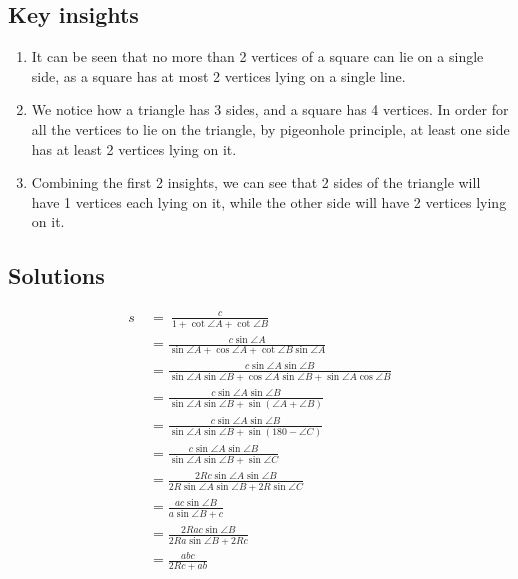 \documentclass[12pt]{scrartcl}
\begin{document}
\subsection{Key insights}
\begin{enumerate}
	\item It can be seen that no more than 2 vertices of a square can lie on a single side, as a square has at most 2 vertices lying on a single line.
	\item We notice how a triangle has 3 sides, and a square has 4 vertices. In order for all the vertices to lie on the triangle, by pigeonhole principle, at least one side has at least 2 vertices lying on it.
	\item Combining the first 2 insights, we can see that 2 sides of the triangle will have 1 vertices each lying on it, while the other side will have 2 vertices lying on it.
\end{enumerate}

\subsection{Solutions}
\begin{align*}
s\ &=\ \frac{c}{1+\cot \angle A+\cot \angle B} \\
&=\frac{c\sin \angle A}{\sin \angle A+\cos \angle A+\cot \angle B\sin \angle A} \\
&=\frac{c\sin \angle A\sin \angle B}{\sin \angle A\sin \angle B+\cos \angle A\sin \angle B+\sin \angle A\cos \angle B} \\
&=\frac{c\sin \angle A\sin \angle B}{\sin \angle A\sin \angle B+\sin\left(\angle A+\angle B\right)} \\
&=\frac{c\sin \angle A\sin \angle B}{\sin \angle A\sin \angle B+\sin\left(180-\angle C\right)} \\
&=\frac{c\sin \angle A\sin \angle B}{\sin \angle A\sin \angle B+\sin \angle C} \\
&=\frac{2Rc\sin \angle A\sin \angle B}{2R\sin \angle A\sin \angle B+2R\sin \angle C} \\
&=\frac{ac\sin \angle B}{a\sin \angle B+c} \\
&=\frac{2Rac\sin \angle B}{2Ra\sin \angle B+2Rc} \\
&=\frac{abc}{2Rc+ab}
\end{align*}


\printbibliography
\end{document}
